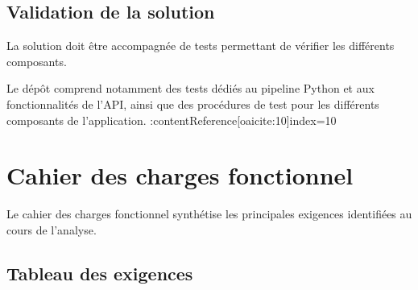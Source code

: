 \subsection{Validation de la solution}

La solution doit être accompagnée de tests permettant de vérifier les
différents composants.

Le dépôt comprend notamment des tests dédiés au pipeline Python et aux
fonctionnalités de l'API, ainsi que des procédures de test pour les
différents composants de l'application. :contentReference[oaicite:10]{index=10}


\section{Cahier des charges fonctionnel}

Le cahier des charges fonctionnel synthétise les principales exigences
identifiées au cours de l'analyse.

\subsection{Tableau des exigences}

